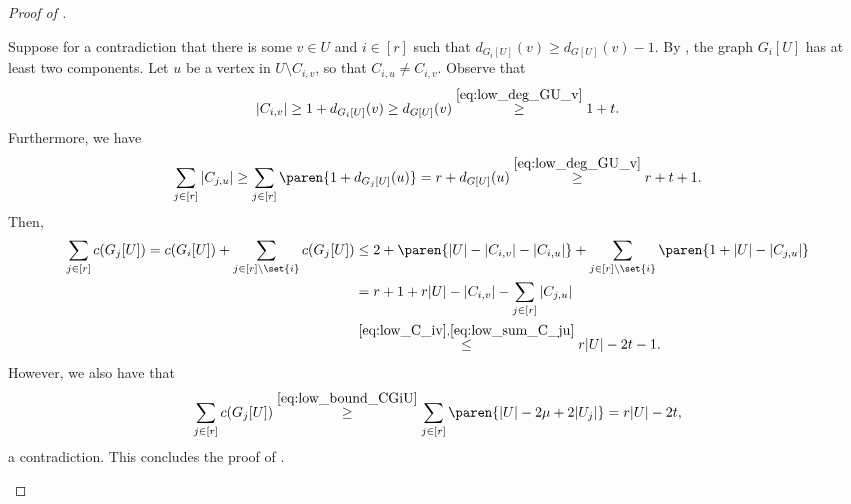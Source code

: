 \documentclass[10pt,a4paper,reqno]{amsart}
\begin{document}
\begin{proof}[Proof of ]
\begin{claimproof}
Suppose for a contradiction that there is some $v \in U$ and $i \in [r]$ such that $d_{G_i[U]}(v) \ge d_{G[U]}(v) - 1$. By , the graph $G_i[U]$ has at least two components. Let $u$ be a vertex in $U \setminus C_{i, v}$, so that $C_{i, u} \neq C_{i, v}$.
Observe that
\begin{equation}
      \label{eq:low_C_iv}
      |C_{i, v}| \geq 1 + d_{G_i[U]}(v) \geq  d_{G[U]}(v)
      \stackrel{\Cref{eq:low_deg_GU_v}}{\geq} 1 + t.
\end{equation}
Furthermore, we have
\begin{equation}
      \label{eq:low_sum_C_ju}
      \sum_{j \in [r]} |C_{j, u}| \geq \sum_{j \in [r]} \paren{1 + d_{G_j[U]}(u)} = r + d_{G[U]}(u)
      \stackrel{\Cref{eq:low_deg_GU_v}}{\geq} r + t + 1.
\end{equation}
Then,
\begin{align*}
      \sum_{j \in [r]} c(G_j[U]) = c(G_i[U]) + \sum_{j \in [r] \setminus \set{i}} c(G_j[U]) &\leq 2 + \paren{|U| - |C_{i, v}| - |C_{i, u}|} + \sum_{j \in [r] \setminus \set{i}} \paren{1 + |U| - |C_{j, u}|} \\
      &= r + 1  + r|U| - |C_{i, v}| - \sum_{j \in [r]} |C_{j, u}| \\
      &\stackrel{\Cref{eq:low_C_iv},\Cref{eq:low_sum_C_ju}}{\leq} r|U| - 2t - 1.
\end{align*}
However, we also have that
\begin{equation*}
      \sum_{j \in [r]} c(G_j[U]) \stackrel{\Cref{eq:low_bound_CGiU}}{\geq} \sum_{j \in [r]} \paren{|U| - 2\mu + 2|U_j|} = r|U| - 2t,
\end{equation*}
a contradiction. This concludes the proof of .
\end{claimproof}


\end{proof}
\end{document}
